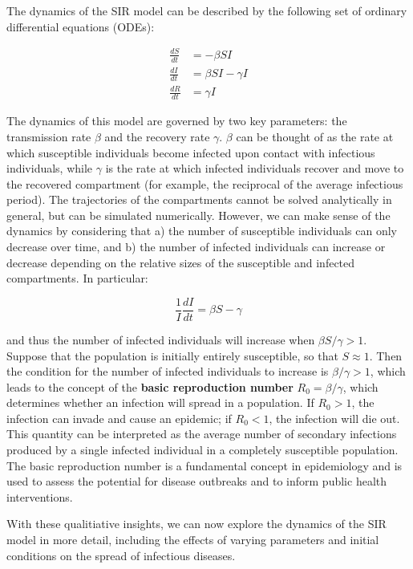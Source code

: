 \documentclass[
  letterpaper,
]{scrbook}
\begin{document}
The dynamics of the SIR model can be described by the following set of
ordinary differential equations (ODEs):

\[
\begin{aligned}
\frac{dS}{dt} &= -\beta S I\\
\frac{dI}{dt} &= \beta S I - \gamma I\\
\frac{dR}{dt} &= \gamma I
\end{aligned}
\]

The dynamics of this model are governed by two key parameters: the
transmission rate \(\beta\) and the recovery rate \(\gamma\). \(\beta\)
can be thought of as the rate at which susceptible individuals become
infected upon contact with infectious individuals, while \(\gamma\) is
the rate at which infected individuals recover and move to the recovered
compartment (for example, the reciprocal of the average infectious
period). The trajectories of the compartments cannot be solved
analytically in general, but can be simulated numerically. However, we
can make sense of the dynamics by considering that a) the number of
susceptible individuals can only decrease over time, and b) the number
of infected individuals can increase or decrease depending on the
relative sizes of the susceptible and infected compartments. In
particular:

\[
\frac{1}{I} \frac{dI}{dt} = \beta S - \gamma
\]

and thus the number of infected individuals will increase when
\(\beta S/\gamma > 1\). Suppose that the population is initially
entirely susceptible, so that \(S \approx 1\). Then the condition for
the number of infected individuals to increase is \(\beta/\gamma > 1\),
which leads to the concept of the \textbf{basic reproduction number}
\(R_0 = \beta / \gamma\), which determines whether an infection will
spread in a population. If \(R_0 > 1\), the infection can invade and
cause an epidemic; if \(R_0 < 1\), the infection will die out. This
quantity can be interpreted as the average number of secondary
infections produced by a single infected individual in a completely
susceptible population. The basic reproduction number is a fundamental
concept in epidemiology and is used to assess the potential for disease
outbreaks and to inform public health interventions.

With these qualitiative insights, we can now explore the dynamics of the
SIR model in more detail, including the effects of varying parameters
and initial conditions on the spread of infectious diseases.
\end{document}
